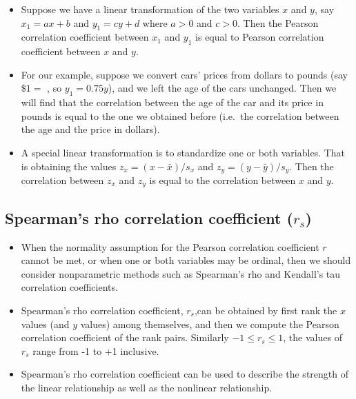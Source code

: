 \documentclass[
]{article}
\begin{document}
\begin{itemize}
\item
  Suppose we have a linear transformation of the two variables \(x\) and
  \(y\), say \(x_1=a x+b\) and \(y_1=cy+d\) where \(a>0\) and \(c>0\).
  Then the Pearson correlation coefficient between \(x_1\) and \(y_1\)
  is equal to Pearson correlation coefficient between \(x\) and \(y\).
\item
  For our example, suppose we convert cars' prices from dollars to
  pounds (say \(\$1=\) , so \(y_1=0.75 y\)), and we
  left the age of the cars unchanged. Then we will find that the
  correlation between the age of the car and its price in pounds is
  equal to the one we obtained before (i.e.~the correlation between the
  age and the price in dollars).
\item
  A special linear transformation is to standardize one or both
  variables. That is obtaining the values \(z_x=(x-\bar{x})/s_x\) and
  \(z_y=(y-\bar{y})/s_y\). Then the correlation between \(z_x\) and
  \(z_y\) is equal to the correlation between \(x\) and \(y\).
\end{itemize}

\hypertarget{spearmans-rho-correlation-coefficient-r_s}{%
\subsection{\texorpdfstring{Spearman's rho correlation coefficient
(\(r_s\))}{Spearman's rho correlation coefficient (r\_s)}}\label{spearmans-rho-correlation-coefficient-r_s}}

\begin{itemize}
\item
  When the normality assumption for the Pearson correlation coefficient
  \(r\) cannot be met, or when one or both variables may be ordinal,
  then we should consider nonparametric methods such as Spearman's rho
  and Kendall's tau correlation coefficients.
\item
  Spearman's rho correlation coefficient, \(r_s\),can be obtained by
  first rank the \(x\) values (and \(y\) values) among themselves, and
  then we compute the Pearson correlation coefficient of the rank pairs.
  Similarly \(-1\leq r_s \leq 1\), the values of \(r_s\) range from -1
  to +1 inclusive.
\item
  Spearman's rho correlation coefficient can be used to describe the
  strength of the linear relationship as well as the nonlinear
  relationship.
\end{itemize}
\end{document}
